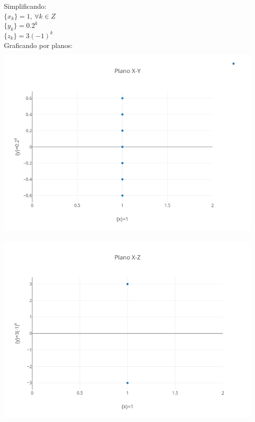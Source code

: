 \documentclass[12pt]{article}
\begin{document}
Simplificando:\\
$\{x_{k}\}=1$, $\forall k \in Z$\\
$\{y_{k}\}=0.2^{k}$\\
$\{z_{k}\}=3(-1)^{k}$\\

Graficando por planos:\\
\includegraphics[height=10cm]{PlanoXY.png}\\
\includegraphics[height=10cm]{PlanoXZ.png}\\
\end{document}
